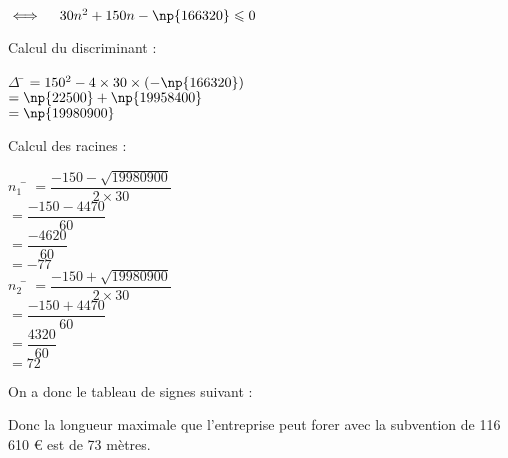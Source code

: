 \documentclass[a4paper,11pt,exos]{nsi}
\begin{document}
\begin{enumerate}
\begin{enumalph}
{\begin{tabbing}
                \> $\iff \quad 30n^2 + 150n - \np{166320} \leqslant 0$
            \end{tabbing}
            Calcul du discriminant :
            \begin{tabbing}
                $\Delta$ \= $= 150^2 - 4 \times 30 \times (-\np{166320})$\\
                \> $= \np{22500} + \np{19958400}$\\
                \> $= \np{19980900}$
            \end{tabbing}
            Calcul des racines :
            \begin{tabbing}
                $n_1$ \= $= \dfrac{-150 - \sqrt{19980900}}{2 \times 30}$\\[.5em]
                    \> $= \dfrac{-150 - 4470}{60}$\\[.5em]
                    \> $= \dfrac{-4620}{60}$\\[.5em]
                    \> $= -77$\\[.5em]
                $n_2$ \= $= \dfrac{-150 + \sqrt{19980900}}{2 \times 30}$\\[.5em]
                    \> $= \dfrac{-150 + 4470}{60}$\\[.5em]
                    \> $= \dfrac{4320}{60}$\\[.5em]
                    \> $= 72$
            \end{tabbing}
            On a donc le tableau de signes suivant :
            \begin{center}
                \end{center}
            Donc la longueur maximale que l'entreprise peut forer avec la subvention de 116 610 € est de 73 mètres.}
    \end{enumalph}
    
    \end{enumerate}
\end{document}
